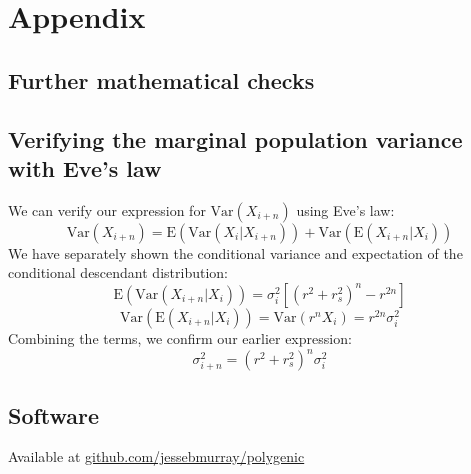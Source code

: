 \documentclass[a4paper,11pt]{article} %
\begin{document}
\clearpage







\clearpage



\section{Appendix}

\subsection{Further mathematical checks}
\subsection*{Verifying the marginal population variance with Eve's law}
We can verify our expression for $\mathrm{Var}(X_{i+n})$ using Eve's law:
%
$$\mathrm{Var}(X_{i+n}) = \mathrm{E}(\mathrm{Var}(X_i|X_{i+n})) + \mathrm{Var}(\mathrm{E}(X_{i+n}|X_i))$$
%
We have separately shown the conditional variance and expectation of the conditional descendant distribution:
%
$$\mathrm{E}(\mathrm{Var}(X_{i+n}|X_i)) = \sigma_i^2 [(r^2+r_s^2)^n-r^{2n}]$$
$$\mathrm{Var}(\mathrm{E}(X_{i+n}|X_i)) = \mathrm{Var}(r^nX_i) = r^{2n}\sigma_i^2$$
%
Combining the terms, we confirm our earlier expression:
%
$$\sigma_{i+n}^2 = (r^2+r_s^2)^n  \sigma_i^2$$

\subsection{Software}
Available at \href{https://github.com/jessebmurray/polygenic}{github.com/jessebmurray/polygenic}



\end{document}
